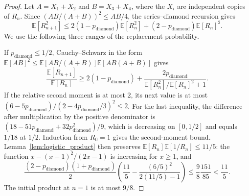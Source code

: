 \documentclass{article}
\theoremstyle{plain}
\theoremstyle{definition}
\begin{document}
\begingroup\color{red}
\begin{proof}
Let $A=X_1+X_2$ and $B=X_3+X_4$, where the $X_i$ are independent
copies of $R_n$. Since $(AB/(A+B))^2\le AB/4$, the series--diamond
recursion gives
\begin{equation}\label{eq:sec4_second_moment}
\mathbb E[R_{n+1}^2]
\le2(1-p_{\mathrm{diamond}})\mathbb E[R_n^2]
 +(2-p_{\mathrm{diamond}})\mathbb E[R_n]^2.
\end{equation}
We use the following three ranges of the replacement probability.

If $p_{\mathrm{diamond}}\le1/2$, Cauchy--Schwarz in the form
$\mathbb E[AB]^2\le\mathbb E[AB/(A+B)]\mathbb E[AB(A+B)]$ gives
\[
\frac{\mathbb E[R_{n+1}]}{\mathbb E[R_n]}
\ge2(1-p_{\mathrm{diamond}})
 +\frac{2p_{\mathrm{diamond}}}
 {\mathbb E[R_n^2]/\mathbb E[R_n]^2+1}.
\]
If the relative second moment is at most $2$, its next value is at most
$(6-5p_{\mathrm{diamond}})/(2-4p_{\mathrm{diamond}}/3)^2\le2$.
For the last inequality, the difference after multiplication by the
positive denominator is
$(18-51p_{\mathrm{diamond}}+32p_{\mathrm{diamond}}^2)/9$,
which is decreasing on $[0,1/2]$ and equals $1/18$ at $1/2$.
Induction from $R_0=1$ gives the second-moment bound.
Lemma~\ref{lem:logistic_product} then preserves
$\mathbb E[R_n]\mathbb E[1/R_n]\le11/5$: the function
$x-(x-1)^2/(2x-1)$ is increasing for $x\ge1$, and
\[
\frac{(2-p_{\mathrm{diamond}})(1+p_{\mathrm{diamond}})}2
\left(\frac{11}5-\frac{(6/5)^2}{2(11/5)-1}\right)
\le\frac98\frac{151}{85}<\frac{11}5.
\]
The initial product at $n=1$ is at most $9/8$.


\end{proof}
\end{document}
